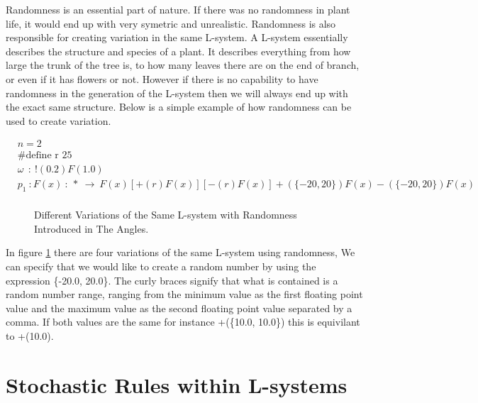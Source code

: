 \begin{flushleft}

Randomness is an essential part of nature. If there was no randomness in plant life, it would end up with very symetric and unrealistic. Randomness is also responsible for creating variation in the same L-system. A L-system essentially describes the structure and species of a plant. It describes everything from how large the trunk of the tree is, to how many leaves there are on the end of branch, or even if it has flowers or not. However if there is no capability to have randomness in the generation of the L-system then we will always end up with the exact same structure. 
\vspace{5mm}
Below is a simple example of how randomness can be used to create variation.

\begin{equation} \label{randomness example}
\begin{aligned}
	&n=2\\
	&\text{\#define r 25} \\
	&\omega~~ :~ !(0.2)F(1.0)\\
	&p_1~ :  F(x)~ :~ *~ \rightarrow~ F(x)[+(r)F(x)][-(r)F(x)]+(\{-20, 20\})F(x)-(\{-20, 20\})F(x)\\
\end{aligned}
\end{equation}

\begin{figure}[htbp]

	{\centering
		\setlength{\fboxrule}{0pt}
		\caption{Different Variations of the Same L-system with Randomness Introduced in The Angles. \label{figRandomness}}
	}
\end{figure}

\FloatBarrier

In figure \ref{figRandomness} there are four variations of the same L-system using randomness, We can specify that we would like to create a random number by using the expression \{-20.0, 20.0\}. The curly braces signify that what is contained is a random number range, ranging from the minimum value as the first floating point value and the maximum value as the second floating point value separated by a comma. If both values are the same for instance +(\{10.0, 10.0\}) this is equivilant to +(10.0).

\end{flushleft}

\section{Stochastic Rules within L-systems} \label{Stochastic L-system Subsection}

